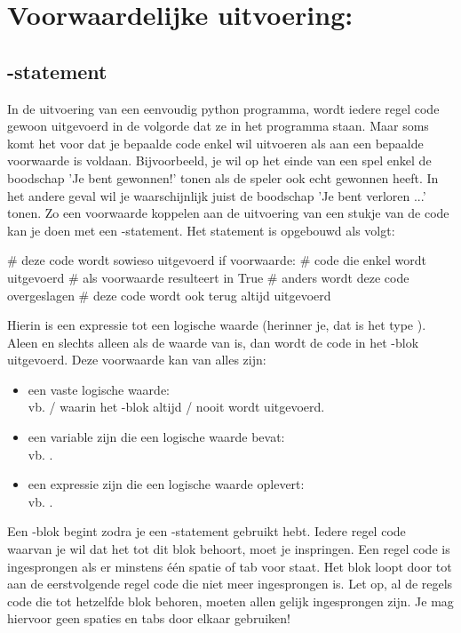 \section{Voorwaardelijke uitvoering: }

\subsection{-statement}

In de uitvoering van een eenvoudig python programma,
wordt iedere regel code gewoon uitgevoerd in de volgorde dat ze in het programma staan.
Maar soms komt het voor dat je bepaalde code enkel wil uitvoeren als aan een bepaalde voorwaarde is voldaan.
Bijvoorbeeld, je wil op het einde van een spel enkel de boodschap 'Je bent gewonnen!' tonen als de speler ook echt gewonnen heeft.
In het andere geval wil je waarschijnlijk juist de boodschap 'Je bent verloren ...' tonen.
Zo een voorwaarde koppelen aan de uitvoering van een stukje van de code kan je doen met een -statement.
Het statement is opgebouwd als volgt:
\begin{pyEnv}
# deze code wordt sowieso uitgevoerd
if voorwaarde:
	# code die enkel wordt uitgevoerd
	# als voorwaarde resulteert in True
	# anders wordt deze code overgeslagen
# deze code wordt ook terug altijd uitgevoerd
\end{pyEnv}
Hierin is  een expressie tot een logische waarde (herinner je, dat is het type \booleantype).
Aleen en slechts alleen als de waarde van  \true is, dan wordt de code in het -blok uitgevoerd.
Deze voorwaarde kan van alles zijn:
\begin{itemize}
	\item
		een vaste logische waarde: \\
		vb.  /  waarin het -blok altijd / nooit wordt uitgevoerd.
	\item
		een variable zijn die een logische waarde bevat: \\
		vb. .
	\item een expressie zijn die een logische waarde oplevert: \\
		vb. .
\end{itemize}
Een -blok begint zodra je een -statement gebruikt hebt.
Iedere regel code waarvan je wil dat het tot dit blok behoort, moet je inspringen.
Een regel code is ingesprongen als er minstens één spatie of tab voor staat.
Het blok loopt door tot aan de eerstvolgende regel code die niet meer ingesprongen is.
Let op, al de regels code die tot hetzelfde blok behoren, moeten allen gelijk ingesprongen zijn.
Je mag hiervoor geen spaties en tabs door elkaar gebruiken!


